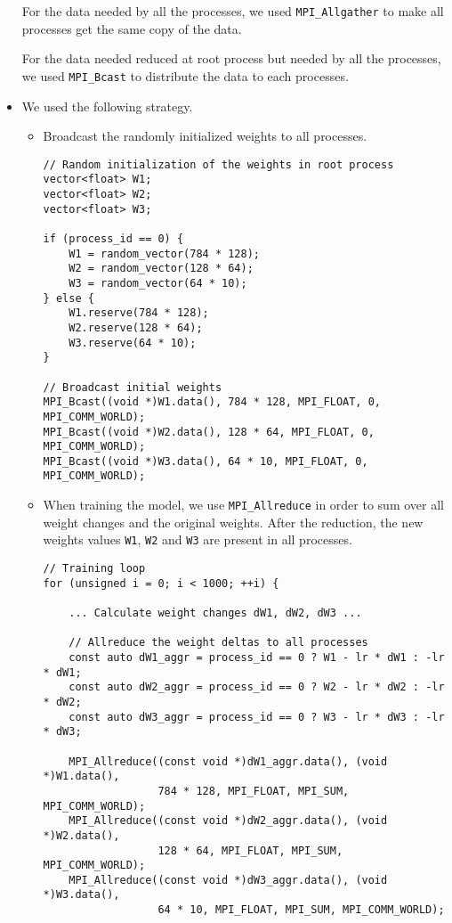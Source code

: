 \documentclass[a4paper, DIV12, headsepline]{scrartcl}
\begin{document}
\begin{itemize}
For the data needed by all the processes, we used  \texttt{MPI\_Allgather} to make all processes get the same copy of the data.

For the data needed reduced at root process but needed by all the processes, we used  \texttt{MPI\_Bcast} to distribute the data to each processes.


\item We used the following strategy.
\begin{itemize}
\item Broadcast the randomly initialized weights to all processes.
\begin{verbatim}
// Random initialization of the weights in root process
vector<float> W1;
vector<float> W2;
vector<float> W3;

if (process_id == 0) {
    W1 = random_vector(784 * 128);
    W2 = random_vector(128 * 64);
    W3 = random_vector(64 * 10);
} else {
    W1.reserve(784 * 128);
    W2.reserve(128 * 64);
    W3.reserve(64 * 10);
}

// Broadcast initial weights
MPI_Bcast((void *)W1.data(), 784 * 128, MPI_FLOAT, 0, MPI_COMM_WORLD);
MPI_Bcast((void *)W2.data(), 128 * 64, MPI_FLOAT, 0, MPI_COMM_WORLD);
MPI_Bcast((void *)W3.data(), 64 * 10, MPI_FLOAT, 0, MPI_COMM_WORLD);
\end{verbatim}

\item When training the model, we use \verb|MPI_Allreduce| in order to sum over all weight changes and the original weights. After the reduction, the new weights values \texttt{W1}, \texttt{W2} and \texttt{W3} are present in all processes.
\begin{verbatim}
// Training loop
for (unsigned i = 0; i < 1000; ++i) {
   
    ... Calculate weight changes dW1, dW2, dW3 ...

    // Allreduce the weight deltas to all processes
    const auto dW1_aggr = process_id == 0 ? W1 - lr * dW1 : -lr * dW1;
    const auto dW2_aggr = process_id == 0 ? W2 - lr * dW2 : -lr * dW2;
    const auto dW3_aggr = process_id == 0 ? W3 - lr * dW3 : -lr * dW3;

    MPI_Allreduce((const void *)dW1_aggr.data(), (void *)W1.data(),
                  784 * 128, MPI_FLOAT, MPI_SUM, MPI_COMM_WORLD);
    MPI_Allreduce((const void *)dW2_aggr.data(), (void *)W2.data(),
                  128 * 64, MPI_FLOAT, MPI_SUM, MPI_COMM_WORLD);
    MPI_Allreduce((const void *)dW3_aggr.data(), (void *)W3.data(),
                  64 * 10, MPI_FLOAT, MPI_SUM, MPI_COMM_WORLD);


\end{verbatim}
\end{itemize}
\end{itemize}
\end{document}
